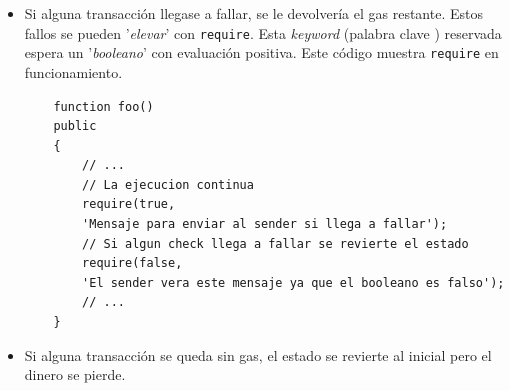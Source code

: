 \begin{itemize}
    \item Si alguna transacción llegase a fallar, se le devolvería el gas restante. Estos fallos se pueden '\textit{elevar}' con \texttt{require}. Esta \textit{keyword} (palabra clave \cite{web:keyword}) reservada espera un '\textit{booleano}' con evaluación positiva.
Este código muestra \texttt{require} en funcionamiento.
\begin{lstlisting}
    function foo()
    public
    {
        // ... 
        // La ejecucion continua
        require(true,
        'Mensaje para enviar al sender si llega a fallar');
        // Si algun check llega a fallar se revierte el estado 
        require(false,
        'El sender vera este mensaje ya que el booleano es falso');
        // ...
    }
\end{lstlisting}
    \item Si alguna transacción se queda sin gas, el estado se revierte al inicial pero el dinero se pierde.
\end{itemize}

